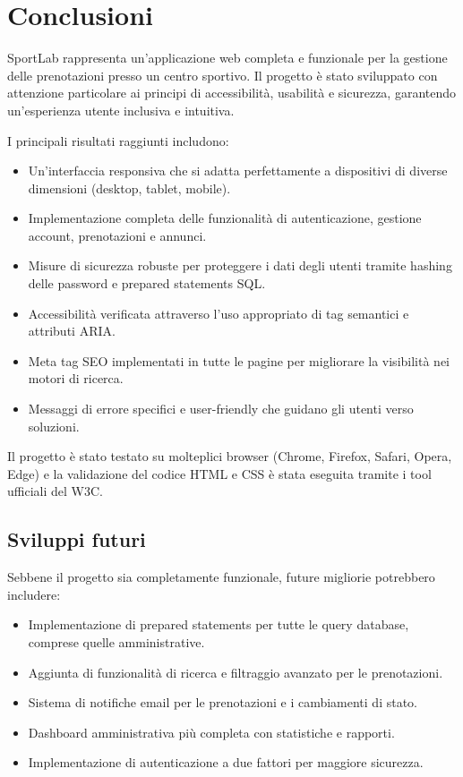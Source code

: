 \documentclass{article}
\begin{document}
\section{Conclusioni}

SportLab rappresenta un'applicazione web completa e funzionale per la gestione delle prenotazioni presso un centro sportivo. Il progetto è stato sviluppato con attenzione particolare ai principi di accessibilità, usabilità e sicurezza, garantendo un'esperienza utente inclusiva e intuitiva.

I principali risultati raggiunti includono:

\begin{itemize}
    \item Un'interfaccia responsiva che si adatta perfettamente a dispositivi di diverse dimensioni (desktop, tablet, mobile).
    \item Implementazione completa delle funzionalità di autenticazione, gestione account, prenotazioni e annunci.
    \item Misure di sicurezza robuste per proteggere i dati degli utenti tramite hashing delle password e prepared statements SQL.
    \item Accessibilità verificata attraverso l'uso appropriato di tag semantici e attributi ARIA.
    \item Meta tag SEO implementati in tutte le pagine per migliorare la visibilità nei motori di ricerca.
    \item Messaggi di errore specifici e user-friendly che guidano gli utenti verso soluzioni.
\end{itemize}

Il progetto è stato testato su molteplici browser (Chrome, Firefox, Safari, Opera, Edge) e la validazione del codice HTML e CSS è stata eseguita tramite i tool ufficiali del W3C. 

\subsection{Sviluppi futuri}
Sebbene il progetto sia completamente funzionale, future migliorie potrebbero includere:

\begin{itemize}
    \item Implementazione di prepared statements per tutte le query database, comprese quelle amministrative.
    \item Aggiunta di funzionalità di ricerca e filtraggio avanzato per le prenotazioni.
    \item Sistema di notifiche email per le prenotazioni e i cambiamenti di stato.
    \item Dashboard amministrativa più completa con statistiche e rapporti.
    \item Implementazione di autenticazione a due fattori per maggiore sicurezza.
\end{itemize}
\end{document}
